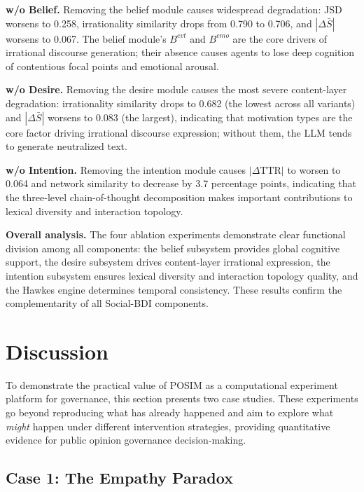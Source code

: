 \documentclass[a4paper,fleqn]{cas-dc}
\begin{document}
\textbf{w/o Belief.} Removing the belief module causes widespread degradation: JSD worsens to 0.258, irrationality similarity drops from 0.790 to 0.706, and $|\Delta\bar{S}|$ worsens to 0.067. The belief module's $B^{evt}$ and $B^{emo}$ are the core drivers of irrational discourse generation; their absence causes agents to lose deep cognition of contentious focal points and emotional arousal.

\textbf{w/o Desire.} Removing the desire module causes the most severe content-layer degradation: irrationality similarity drops to 0.682 (the lowest across all variants) and $|\Delta\bar{S}|$ worsens to 0.083 (the largest), indicating that motivation types are the core factor driving irrational discourse expression; without them, the LLM tends to generate neutralized text.

\textbf{w/o Intention.} Removing the intention module causes $|\Delta\text{TTR}|$ to worsen to 0.064 and network similarity to decrease by 3.7 percentage points, indicating that the three-level chain-of-thought decomposition makes important contributions to lexical diversity and interaction topology.

\textbf{Overall analysis.} The four ablation experiments demonstrate clear functional division among all components: the belief subsystem provides global cognitive support, the desire subsystem drives content-layer irrational expression, the intention subsystem ensures lexical diversity and interaction topology quality, and the Hawkes engine determines temporal consistency. These results confirm the complementarity of all Social-BDI components.

\section{Discussion}\label{sec:discussion}

To demonstrate the practical value of POSIM as a computational experiment platform for governance, this section presents two case studies. These experiments go beyond reproducing what has already happened and aim to explore what \textit{might} happen under different intervention strategies, providing quantitative evidence for public opinion governance decision-making.

\subsection{Case 1: The Empathy Paradox}\label{subsec:case1}
\end{document}
